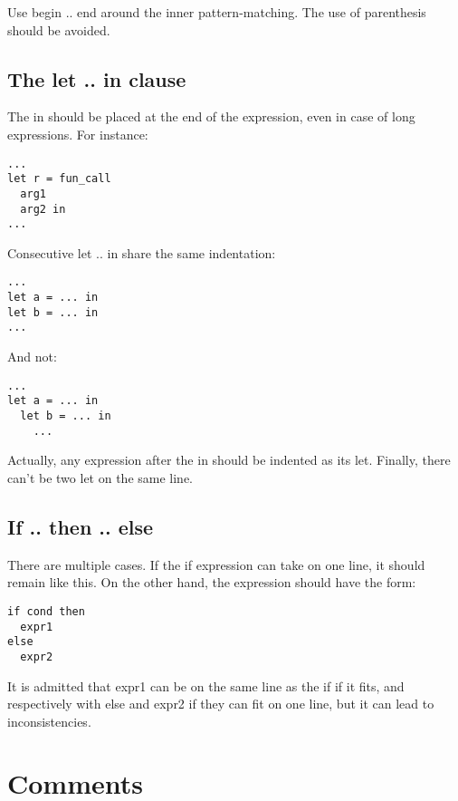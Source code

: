 \documentclass[12pt,a4paper]{article}
\begin{document}
\medskip

Use \textsf{begin .. end} around the inner pattern-matching. The use of
parenthesis should be avoided.

\subsection*{The \textsf{let .. in} clause}

The \textsf{in} should be placed at the end of the expression, even in case of
long expressions. For instance:

\begin{verbatim}
...
let r = fun_call
  arg1
  arg2 in
...
\end{verbatim}

Consecutive \textsf{let .. in} share the same indentation:

\begin{verbatim}
...
let a = ... in
let b = ... in
...
\end{verbatim}

And not:

\begin{verbatim}
...
let a = ... in
  let b = ... in
    ...
\end{verbatim}

Actually, any expression after the \textsf{in} should be indented as its
\textsf{let}. Finally, there can't be two \textsf{let} on the same line.


\subsection*{\textsf{If .. then .. else}}

There are multiple cases. If the \textsf{if} expression can take on one line, it
should remain like this. On the other hand, the expression should have the form:

\begin{verbatim}
if cond then
  expr1
else
  expr2
\end{verbatim} 

It is admitted that \textsf{expr1} can be on the same line as the \textsf{if} if
it fits, and respectively with \textsf{else} and \textsf{expr2} if they can fit
on one line, but it can lead to inconsistencies.

\section{Comments}
\end{document}
